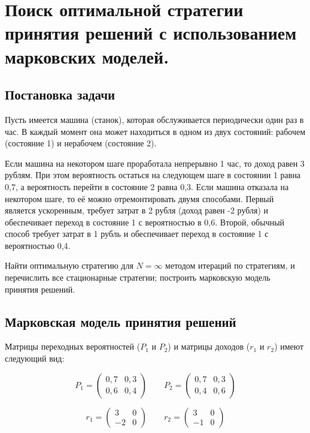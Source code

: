 \newpage
\section{Поиск оптимальной стратегии принятия решений с использованием марковских моделей.}

\subsection{Постановка задачи}
Пусть имеется машина (станок), которая обслуживается периодически один раз в час. В каждый момент она может находиться в одном из двух состояний: рабочем (состояние 1) и нерабочем (состояние 2).

Если машина на некотором шаге проработала непрерывно 1 час, то доход равен 3 рублям. При этом вероятность остаться на следующем шаге в состоянии 1 равна 0,7, а вероятность перейти в состояние 2 равна 0,3. Если машина отказала на некотором шаге, то её можно отремонтировать двумя способами. Первый является ускоренным, требует затрат в 2 рубля (доход равен -2 рубля) и обеспечивает переход в состояние 1 с вероятностью в 0,6. Второй, обычный способ требует затрат в 1 рубль и обеспечивает переход в состояние 1 с вероятностью 0,4.

Найти оптимальную стратегию для $N=\infty$ методом итераций по стратегиям, и перечислить все стационарные стратегии; построить марковскую модель принятия решений.

\subsection{Марковская модель принятия решений}

Матрицы переходных вероятностей ($P_1$ и $P_2$) и матрицы доходов ($r_1$ и $r_2$) имеют следующий вид:

\[ P_1 = \left( \begin{array}{cc}
0,7 & 0,3 \\
0,6 & 0,4
\end{array} \right)\qquad
%
P_2 = \left( \begin{array}{cc}
0,7 & 0,3 \\
0,4 & 0,6
\end{array} \right)
\]

\[ r_1 = \left( \begin{array}{rr}
3 & 0 \\
-2 & 0
\end{array} \right)\qquad
%
r_2 = \left( \begin{array}{rr}
3 & 0 \\
-1 & 0
\end{array} \right)
\]


